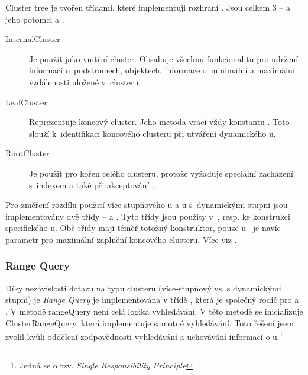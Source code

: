 Cluster tree je tvořen třídami, které implementuji rozhraní \linebreak {}. Jsou celkem 3 -- 
 a jeho potomci   a .

\begin{description}
\item[InternalCluster] Je použit jako vnitřní cluster. Obsahuje všechnu funkcionalitu pro udržení informací o~podstromech, objektech, informace o~minimální a maximální vzdálenosti uložené v~clusteru.
\item[LeafCluster] Reprezentuje koncový cluster. Jeho metoda \linebreak {} vrací vždy konstantu . Toto slouží k~identifikaci koncového clusteru při utváření dynamického \MIndex u.
\item[RootCluster] Je použit pro kořen celého clusteru, protože vyžaduje speciální zacházení s~indexem a také při akceptování .
\end{description}

Pro změření rozdílu použití více-stupňového \MIndex u a \MIndex u s~dynamickými stupni jsou implementovány dvě třídy -- \linebreak {} a \linebreak {}. Tyto třídy jsou použity v~, \linebreak resp.  ke konstrukci specifického \MIndex u.
Obě třídy mají téměř totožný konstruktor, pouze u~ je navíc parametr pro maximální zaplnění koncového clusteru. Více viz .

\subsubsection{Range Query}
Díky nezávislosti dotazu na typu clusteru (více-stupňový vs. s dynamickými stupni) je \emph{Range Query} je implementována v třídě , která je společný rodič pro  a . V metodě rangeQuery není celá logika vyhledávání. V této metodě se inicializuje ClusterRangeQuery, která implementuje samotné vyhledávání. Toto řešení jsem zvolil kvůli oddělení zodpovědnosti vyhledávání a uchovávání informací o \MIndex u.\footnote{Jedná se o tzv. \emph{Single Responsibility Principle}\cite{martin2003agile}}

